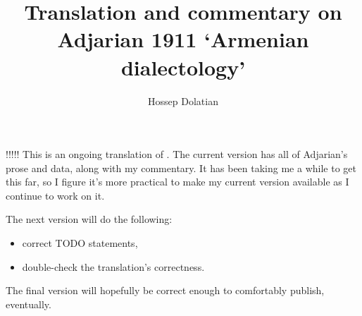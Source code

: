 \documentclass{book}
\title{Translation and commentary  on Adjarian 1911 `Armenian dialectology'}	%
\author{Hossep Dolatian}		%
\begin{document}
 




!!!!! This is an ongoing translation of \citet{Adjarian-1911-DialectologyBook}. The current version has all of Adjarian's prose and data, along with my commentary. It has been taking me a while to get this far, so I figure it's more practical to make my current version available as I continue to work on it.

The next version will do the following:
\begin{itemize}
	\item 
	correct  TODO statements,
	\item  double-check the translation's correctness.
\end{itemize} 

The final version  will hopefully be correct enough to comfortably publish, eventually. 






\maketitle
\end{document}
